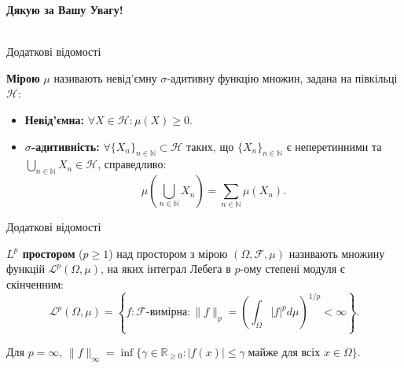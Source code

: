 \documentclass{zkdl-presentation-template}
\begin{document}
    \begin{frame}
      \centering
      \LARGE
      \textbf{Дякую за Вашу Увагу!} \\
      
      \vspace{0.2cm} \Huge {} \large \\
    \end{frame}

    \begin{frame}{Додаткові відомості}
        \begin{definition}[Міра]
            \textbf{Мірою} $\mu$ називають невід'ємну $\sigma$-адитивну функцію 
            множин, задана на півкільці $\mathcal{H}$:
            \begin{itemize}
                \item \textbf{Невід'ємна:} $\forall X \in \mathcal{H}: \mu(X) \geq 0$.
                \item \textbf{$\sigma$-адитивність:} $\forall \{X_n\}_{n \in \mathbb{N}} \subset \mathcal{H}$ таких, що $\{X_n\}_{n \in \mathbb{N}}$ є неперетинними та $\bigcup_{n \in \mathbb{N}}X_n \in \mathcal{H}$, справедливо:
                \begin{equation*}
                    \mu\left(\bigcup_{n \in \mathbb{N}}X_n\right) = \sum_{n \in \mathbb{N}}\mu(X_n).
                \end{equation*}
            \end{itemize}
        \end{definition}
    \end{frame}

    \begin{frame}{Додаткові відомості}
        \begin{definition}[$L^p$ простір]
            \textbf{$L^p$ простором} ($p \geq 1$) над простором з мірою $(\Omega,\mathcal{F},\mu)$ називають множину 
            функцій $\mathcal{L}^p(\Omega,\mu)$, на яких інтеграл Лебега в $p$-ому степені модуля є скінченним:
            \begin{equation*}
                \mathcal{L}^p(\Omega,\mu) = \left\{f: \text{$\mathcal{F}$-вимірна}: \|f\|_p = \left(\int_{\Omega}|f|^pd\mu\right)^{1/p} < \infty\right\}.
            \end{equation*}

            Для $p=\infty$, $\|f\|_{\infty} = \inf\{\gamma \in \mathbb{R}_{\geq 0}: |f(x)| \leq \gamma \; \text{майже для всіх $x \in \Omega$}\}$.
        \end{definition}
    \end{frame}
\end{document}
